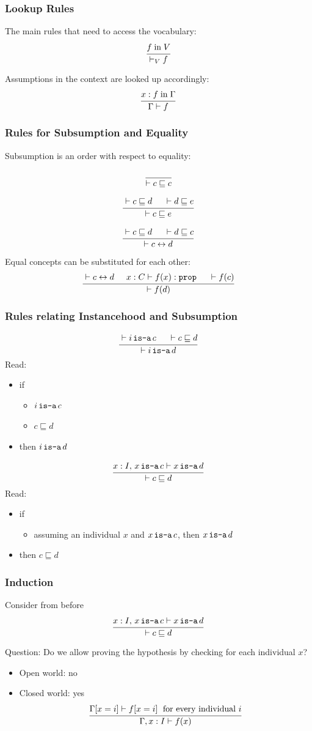 \begin{frame}\frametitle{Lookup Rules}
The main rules that need to access the vocabulary:
\[\cfrac{f\;\mathrm{in}\; V}{\vdash_V f}\,\]
\medskip

Assumptions in the context are looked up accordingly:
\[\cfrac{x:f\;\mathrm{in}\; \Gamma}{\Gamma\vdash f}\,\]
\end{frame}

\begin{frame}\frametitle{Rules for Subsumption and Equality}
Subsumption is an order with respect to equality:
\[\cfrac{}{\vdash c\sqsubseteq c}\,\]

\[\cfrac{\vdash c\sqsubseteq d \hspace*{.5cm} \vdash d\sqsubseteq e}{\vdash c\sqsubseteq e}\,\]

\[\rul{\vdash c\sqsubseteq d \tb \vdash d\sqsubseteq c}{\vdash c\Equiv d}\]

Equal concepts can be substituted for each other:
\[\rul{\vdash c\Equiv d\tb x:C\vdash f(x):\prop \tb \vdash f(c)}{\vdash f(d)}\]

\end{frame}

\begin{frame}\frametitle{Rules relating Instancehood and Subsumption}
\[\cfrac{\vdash i\mathop{\texttt{is-a}} c \hspace*{.5cm} \vdash c\sqsubseteq d}{\vdash i\mathop{\texttt{is-a}} d}\,\]
Read:
\begin{itemize}
\item if
 \begin{itemize}
 \item $i\mathop{\texttt{is-a}} c$
 \item $c\sqsubseteq d$
 \end{itemize}
\item then $i\mathop{\texttt{is-a}} d$
\end{itemize}

\[\cfrac{x:I,\,x\mathop{\texttt{is-a}} c\vdash x\mathop{\texttt{is-a}} d}{\vdash c\sqsubseteq d}\,\]
Read:
\begin{itemize}
\item if
 \begin{itemize}
 \item assuming an individual $x$ and $x\mathop{\texttt{is-a}} c$, then $x\mathop{\texttt{is-a}} d$
 \end{itemize}
\item then $c\sqsubseteq d$
\end{itemize}
\end{frame}

\begin{frame}\frametitle{Induction}
Consider from before
\[\cfrac{x:I,\,x\mathop{\texttt{is-a}} c\vdash x\mathop{\texttt{is-a}} d}{\vdash c\sqsubseteq d}\,\]

Question: Do we allow proving the hypothesis by checking for each individual $x$?
\begin{itemize}
\item<2-> Open world: no
\item<3-> Closed world: yes
 \[\cfrac{\Gamma[x=i]\vdash f[x=i] \;\text{ for every individual } i}{\Gamma, x:I\vdash f(x)}\,\]
\end{itemize}
\end{frame}

